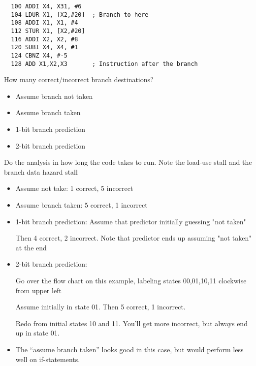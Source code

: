 \begin{frame}[fragile]
\begin{tcolorbox}[enhanced,attach boxed title to top center={yshift=-3mm,yshifttext=-1mm},
  colback=red!5!white,colframe=red!75!black,colbacktitle=red!80!black,
  title=Try this,fonttitle=\bfseries,
  boxed title style={size=small,colframe=red!50!black} ]  
\begin{verbatim}
  100 ADDI X4, X31, #6
  104 LDUR X1, [X2,#20]  ; Branch to here
  108 ADDI X1, X1, #4
  112 STUR X1, [X2,#20]
  116 ADDI X2, X2, #8
  120 SUBI X4, X4, #1
  124 CBNZ X4, #-5
  128 ADD X1,X2,X3       ; Instruction after the branch
\end{verbatim}
How many correct/incorrect branch destinations?
\begin{itemize}
\item Assume branch not taken
\item Assume branch taken
\item 1-bit branch prediction
  \item 2-bit branch prediction
\end{itemize}
\end{tcolorbox}
\BNotes\ifnum{}
Do the analysis in how long the code takes to run.
Note the load-use stall and the branch data hazard stall
\begin{itemize}
\item Assume not take: 1 correct, 5 incorrect

\item Assume branch taken: 5 correct, 1 incorrect
\item 1-bit branch prediction: Assume that predictor initially guessing "not taken"

	Then 4 correct, 2 incorrect.  Note that predictor ends up assuming "not taken" at the end

\item 2-bit branch prediction: 

  Go over the flow chart on this example, labeling states 00,01,10,11 clockwise from upper left

	Assume initially in state 01.  Then 5 correct, 1 incorrect.

		Redo from initial states 10 and 11.  You'll get more incorrect, but always
		end up in state 01.
\item The ``assume branch taken'' looks good in this case, but would perform less well on if-statements.
\end{itemize}
\fi\ENotes
\end{frame}

